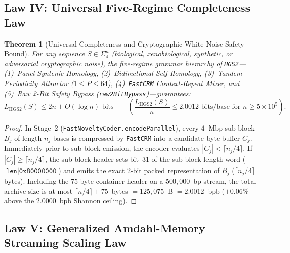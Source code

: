 \documentclass[10pt]{article}
\newtheorem{theorem}{Theorem}
\theoremstyle{definition}
\begin{document}
\subsection{Law IV: Universal Five-Regime Completeness Law}

\begin{theorem}[Universal Completeness and Cryptographic White-Noise Safety Bound]
\label{thm:law4}
For any sequence $S \in \Sigma_4^n$ (biological, xenobiological, synthetic, or adversarial cryptographic noise), the five-regime grammar hierarchy of \texttt{HGS2}---(1)~Panel Syntenic Homology, (2)~Bidirectional Self-Homology, (3)~Tandem Periodicity Attractor ($1 \le P \le 64$), (4)~\texttt{FastCRM} Context-Repeat Mixer, and (5)~Raw 2-Bit Safety Bypass (\texttt{raw2BitBypass})---guarantees:
\begin{equation}
  L_{\text{HGS2}}(S) \le 2n + O(\log n)\text{ bits} \qquad \left(\frac{L_{\text{HGS2}}(S)}{n} \le 2.0012\text{ bits/base for } n \ge 5\times 10^5\right).
\end{equation}
\end{theorem}
\begin{proof}
In Stage~2 (\texttt{FastNoveltyCoder.encodeParallel}), every $4$~Mbp sub-block $B_j$ of length $n_j$ bases is compressed by \texttt{FastCRM} into a candidate byte buffer $C_j$. Immediately prior to sub-block emission, the encoder evaluates $|C_j| < \lceil n_j / 4 \rceil$. If $|C_j| \ge \lceil n_j / 4 \rceil$, the sub-block header sets bit~31 of the sub-block length word ($\texttt{len} \mid \texttt{0x80000000}$) and emits the exact 2-bit packed representation of $B_j$ ($\lceil n_j / 4 \rceil$ bytes). Including the $75$-byte container header on a $500,000$~bp stream, the total archive size is at most $\lceil n/4 \rceil + 75$~bytes $= 125,075$~B $= 2.0012$~bpb ($+0.06\%$ above the $2.0000$~bpb Shannon ceiling).
\end{proof}

\subsection{Law V: Generalized Amdahl-Memory Streaming Scaling Law}
\end{document}
